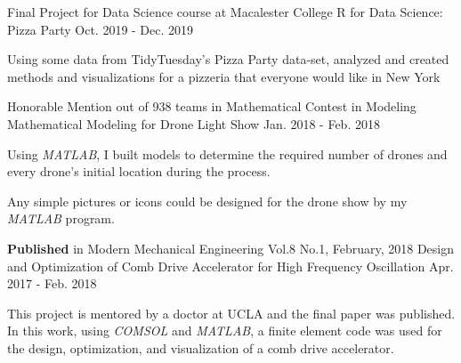 

\begin{cventries}
  \cventry
    {Final Project for Data Science course at Macalester College} %
    {R for Data Science: Pizza Party} %
    {} %
    {Oct. 2019 - Dec. 2019} %
    {
      \begin{cvitems} %
        \item {Using some data from TidyTuesday’s Pizza Party data-set, analyzed and created methods and visualizations for a pizzeria that everyone would like in New York}
      \end{cvitems}
    }

  \cventry
    {Honorable Mention out of 938 teams in Mathematical Contest in Modeling} %
    {Mathematical Modeling for Drone Light Show} %
    {} %
    {Jan. 2018 - Feb. 2018} %
    {
      \begin{cvitems} %
        \item {Using \textit{MATLAB}, I built models to determine the required number of drones and every drone’s initial location during the process.}
        \item {Any simple pictures or icons could be designed for the drone show by my \textit{MATLAB} program.}
      \end{cvitems}
    }


  \cventry
    {\textbf{Published} in Modern Mechanical Engineering Vol.8 No.1, February, 2018} %
    {Design and Optimization of Comb Drive Accelerator for High Frequency Oscillation} %
    {} %
    {Apr. 2017 - Feb. 2018} %
    {
      \begin{cvitems} %
        \item {This project is mentored by a doctor at UCLA and the final paper was published. In this work, using \textit{COMSOL} and \textit{MATLAB}, a finite element code was used for the design, optimization, and visualization of a comb drive accelerator.}
      \end{cvitems}
    }
    

\end{cventries}
